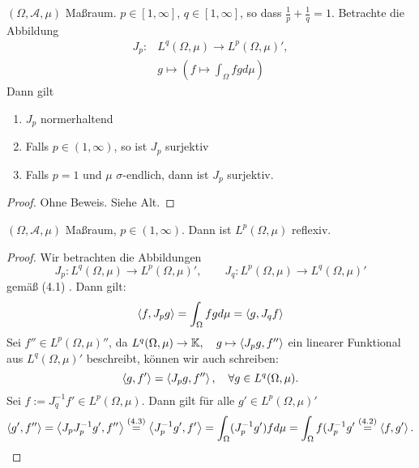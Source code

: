 	\begin{thm}
		$(\Omega, \mathcal{A}, \mu)$ Maßraum. $p\in [1, \infty]$, $q\in [1,\infty]$, so dass $\frac{1}{p} + \frac{1}{q} = 1$. Betrachte die Abbildung
		\begin{equation}
		\begin{split}
			 J_p : & L^q(\Omega,\mu) \to L^p (\Omega, \mu)',\\ &
			 g \mapsto (f \mapsto \int_\Omega fg d\mu) 		
		\end{split}
		\end{equation}
		Dann gilt 
			\begin{enumerate}
				\item $J_p$ normerhaltend
				\item Falls $p \in (1,\infty)$, so ist $J_p$ surjektiv
				\item Falls $p = 1$ und $\mu$ $\sigma$-endlich, dann ist $J_p$ surjektiv.
			\end{enumerate}
	\end{thm}
	\begin{proof}
		Ohne Beweis. Siehe Alt.
	\end{proof}
	
	\begin{cor}
		$(\Omega, \mathcal{A}, \mu)$ Maßraum, $p\in (1,\infty)$. Dann ist $L^p (\Omega, \mu)$ reflexiv.
	\end{cor}
	\begin{proof}
		Wir betrachten die Abbildungen 
		$$J_p : L^q(\Omega,\mu) \to L^p(\Omega,\mu)',\qquad J_q:L^p(\Omega,\mu)\to L^q(\Omega,\mu)'$$	
		gemäß (4.1) . Dann gilt:
		\begin{equation}
			\left \langle f,J_p g \right \rangle = \int_\Omega fgd\mu  = \left \langle g,J_q f \right \rangle
		\end{equation}
		Sei $f'' \in L^p(\Omega,\mu)''$, da $L^q(\Omega,\mu) \to \mathbb{K},\quad g \mapsto \left \langle J_pg, f'' \right \rangle$ ein linearer Funktional aus $L^q(\Omega,\mu)'$ beschreibt, können wir auch schreiben:
		\begin{equation}
			\left \langle g,f' \right \rangle = \left \langle J_p g, f'' \right \rangle,\quad \forall g\in L^q(\Omega, \mu)		.	
		\end{equation}
		Sei $f:= J^{-1}_q f' \in L^p(\Omega,\mu).$ Dann gilt für alle $g'\in L^p(\Omega,\mu)'$
		$$\left \langle g',f'' \right \rangle = \left \langle J_p { J^{-1}_p g'} , f'' \right \rangle \overset{(4.3)}{ = } \left \langle J^{-1}_p g',f' \right \rangle = \int_\Omega (J^{-1}_p g') f d \mu = \int_\Omega f (J_p^{-1} g' \overset{(4.2)}{=} \left \langle f,g' \right \rangle.$$
	\end{proof}		

